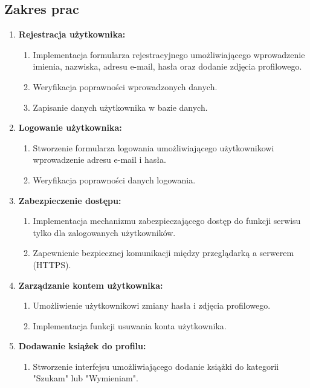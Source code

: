 \documentclass[12pt]{article}
\begin{document}
\subsection{Zakres prac}
\begin{enumerate}[label=\large\textbf{\arabic*.}]
	\item \textbf{\large Rejestracja użytkownika:}
	\begin{enumerate}[label=$\circ$, leftmargin=0.2cm]
		\item Implementacja formularza rejestracyjnego umożliwiającego wprowadzenie
		imienia, nazwiska, adresu e-mail, hasła oraz dodanie zdjęcia profilowego.
		\item Weryfikacja poprawności wprowadzonych danych.
		\item Zapisanie danych użytkownika w bazie danych.
	\end{enumerate}
	\item \textbf{\large Logowanie użytkownika:}
	\begin{enumerate}[label=$\circ$, leftmargin=0.2cm]
		\item Stworzenie formularza logowania umożliwiającego użytkownikowi wprowadzenie adresu e-mail i hasła.
		\item Weryfikacja poprawności danych logowania.
	\end{enumerate}
	\item \textbf{\large Zabezpieczenie dostępu:}
	\begin{enumerate}[label=$\circ$, leftmargin=0.2cm]
		\item Implementacja mechanizmu zabezpieczającego dostęp do funkcji serwisu tylko dla zalogowanych użytkowników.
		\item Zapewnienie bezpiecznej komunikacji między przeglądarką a serwerem (HTTPS).
	\end{enumerate}
	\item \textbf{\large Zarządzanie kontem użytkownika:}
	\begin{enumerate}[label=$\circ$, leftmargin=0.2cm]
		\item Umożliwienie użytkownikowi zmiany hasła i zdjęcia profilowego.
		\item Implementacja funkcji usuwania konta użytkownika.
	\end{enumerate}
	\item \textbf{\large Dodawanie książek do profilu:}
	\begin{enumerate}[label=$\circ$, leftmargin=0.2cm]
		\item Stworzenie interfejsu umożliwiającego dodanie książki do kategorii "Szukam" lub "Wymieniam".

\end{enumerate}
\end{enumerate}
\end{document}
